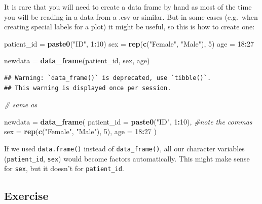 \documentclass[12pt,]{krantz}
\makeatletter
\newenvironment{Shaded}{\begin{snugshade}}{\end{snugshade}}
\newcommand{\CommentTok}[1]{\textcolor[rgb]{0.56,0.35,0.01}{\textit{#1}}}
\newcommand{\DataTypeTok}[1]{\textcolor[rgb]{0.13,0.29,0.53}{#1}}
\newcommand{\DecValTok}[1]{\textcolor[rgb]{0.00,0.00,0.81}{#1}}
\newcommand{\KeywordTok}[1]{\textcolor[rgb]{0.13,0.29,0.53}{\textbf{#1}}}
\newcommand{\NormalTok}[1]{#1}
\newcommand{\OperatorTok}[1]{\textcolor[rgb]{0.81,0.36,0.00}{\textbf{#1}}}
\newcommand{\StringTok}[1]{\textcolor[rgb]{0.31,0.60,0.02}{#1}}
\newenvironment{kframe}{%
\medskip{}
\setlength{\fboxsep}{.8em}
 \def\at@end@of@kframe{}%
 \ifinner\ifhmode%
  \def\at@end@of@kframe{\end{minipage}}%
  \begin{minipage}{\columnwidth}%
 \fi\fi%
 \def\FrameCommand##1{\hskip\@totalleftmargin \hskip-\fboxsep
 \colorbox{shadecolor}{##1}\hskip-\fboxsep
     \hskip-\linewidth \hskip-\@totalleftmargin \hskip\columnwidth}%
 \MakeFramed {\advance\hsize-\width
   \@totalleftmargin\z@ \linewidth\hsize
   \@setminipage}}%
 {\par\unskip\endMakeFramed%
 \at@end@of@kframe}
\renewenvironment{Shaded}{\begin{kframe}}{\end{kframe}}
\theoremstyle{definition}
\theoremstyle{definition}
\theoremstyle{definition}
\theoremstyle{remark}
\makeatother
\begin{document}
It is rare that you will need to create a data frame by hand as most of
the time you will be reading in a data from a .csv or similar. But in
some cases (e.g.~when creating special labels for a plot) it might be
useful, so this is how to create one:

\begin{Shaded}
\begin{Highlighting}[]
\NormalTok{patient_id =}\StringTok{ }\KeywordTok{paste0}\NormalTok{(}\StringTok{"ID"}\NormalTok{, }\DecValTok{1}\OperatorTok{:}\DecValTok{10}\NormalTok{)}
\NormalTok{sex        =}\StringTok{ }\KeywordTok{rep}\NormalTok{(}\KeywordTok{c}\NormalTok{(}\StringTok{"Female"}\NormalTok{, }\StringTok{"Male"}\NormalTok{), }\DecValTok{5}\NormalTok{)}
\NormalTok{age        =}\StringTok{ }\DecValTok{18}\OperatorTok{:}\DecValTok{27}

\NormalTok{newdata =}\StringTok{ }\KeywordTok{data_frame}\NormalTok{(patient_id, sex, age)}
\end{Highlighting}
\end{Shaded}

\begin{verbatim}
## Warning: `data_frame()` is deprecated, use `tibble()`.
## This warning is displayed once per session.
\end{verbatim}

\begin{Shaded}
\begin{Highlighting}[]
\CommentTok{# same as}

\NormalTok{newdata      =}\StringTok{ }\KeywordTok{data_frame}\NormalTok{(}
  \DataTypeTok{patient_id =} \KeywordTok{paste0}\NormalTok{(}\StringTok{"ID"}\NormalTok{, }\DecValTok{1}\OperatorTok{:}\DecValTok{10}\NormalTok{), }\CommentTok{#note the commas}
  \DataTypeTok{sex        =} \KeywordTok{rep}\NormalTok{(}\KeywordTok{c}\NormalTok{(}\StringTok{"Female"}\NormalTok{, }\StringTok{"Male"}\NormalTok{), }\DecValTok{5}\NormalTok{),}
  \DataTypeTok{age        =} \DecValTok{18}\OperatorTok{:}\DecValTok{27}
\NormalTok{)}
\end{Highlighting}
\end{Shaded}

If we used \texttt{data.frame()} instead of \texttt{data\_frame()}, all
our character variables (\texttt{patient\_id}, \texttt{sex}) would
become factors automatically. This might make sense for \texttt{sex},
but it doesn't for \texttt{patient\_id}.

\hypertarget{exercise-10}{%
\subsection{Exercise}\label{exercise-10}}
\end{document}
